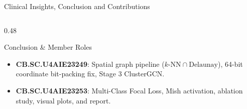 \documentclass[aspectratio=169, 10pt]{beamer}
\begin{document}
\begin{frame}{Clinical Insights, Conclusion and Contributions}
\begin{columns}[onlytextwidth, t]
\begin{column}{0.48\textwidth}
\begin{exampleblock}{Conclusion \& Member Roles}
\begin{itemize}
\begin{itemize}
            \item \textbf{CB.SC.U4AIE23249}: Spatial graph pipeline ($k\text{-NN} \cap \text{Delaunay}$), 64-bit coordinate bit-packing fix, Stage 3 ClusterGCN.
            \item \textbf{CB.SC.U4AIE23253}: Multi-Class Focal Loss, Mish activation, ablation study, visual plots, and report.
          \end{itemize}
      \end{itemize}
    \end{exampleblock}
  \end{column}
\end{columns}
\end{frame}
\end{document}
